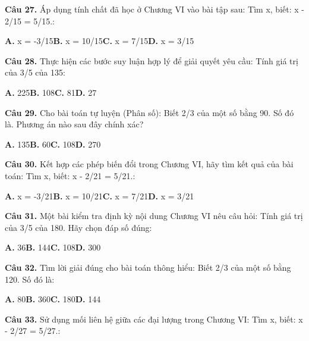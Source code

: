 \documentclass[11pt,a4paper]{article}
\begin{document}
\textbf{\color{primary} Câu 27.} Áp dụng tính chất đã học ở Chương VI vào bài tập sau: Tìm x, biết: x - 2/15 = 5/15.:\par
\hspace*{1.5em}\textbf{A.} x = -3/15\quad\quad \textbf{B.} x = 10/15\quad\quad \textbf{C.} x = 7/15\quad\quad \textbf{D.} x = 3/15\par\vspace{2pt}
\textbf{\color{primary} Câu 28.} Thực hiện các bước suy luận hợp lý để giải quyết yêu cầu: Tính giá trị của 3/5 của 135:\par
\hspace*{1.5em}\textbf{A.} 225\quad\quad \textbf{B.} 108\quad\quad \textbf{C.} 81\quad\quad \textbf{D.} 27\par\vspace{2pt}
\textbf{\color{primary} Câu 29.} Cho bài toán tự luyện (Phân số): Biết 2/3 của một số bằng 90. Số đó là. Phương án nào sau đây chính xác?\par
\hspace*{1.5em}\textbf{A.} 135\quad\quad \textbf{B.} 60\quad\quad \textbf{C.} 108\quad\quad \textbf{D.} 270\par\vspace{2pt}
\textbf{\color{primary} Câu 30.} Kết hợp các phép biến đổi trong Chương VI, hãy tìm kết quả của bài toán: Tìm x, biết: x - 2/21 = 5/21.:\par
\hspace*{1.5em}\textbf{A.} x = -3/21\quad\quad \textbf{B.} x = 10/21\quad\quad \textbf{C.} x = 7/21\quad\quad \textbf{D.} x = 3/21\par\vspace{2pt}
\textbf{\color{primary} Câu 31.} Một bài kiểm tra định kỳ nội dung Chương VI nêu câu hỏi: Tính giá trị của 3/5 của 180. Hãy chọn đáp số đúng:\par
\hspace*{1.5em}\textbf{A.} 36\quad\quad \textbf{B.} 144\quad\quad \textbf{C.} 108\quad\quad \textbf{D.} 300\par\vspace{2pt}
\textbf{\color{primary} Câu 32.} Tìm lời giải đúng cho bài toán thông hiểu: Biết 2/3 của một số bằng 120. Số đó là:\par
\hspace*{1.5em}\textbf{A.} 80\quad\quad \textbf{B.} 360\quad\quad \textbf{C.} 180\quad\quad \textbf{D.} 144\par\vspace{2pt}
\textbf{\color{primary} Câu 33.} Sử dụng mối liên hệ giữa các đại lượng trong Chương VI: Tìm x, biết: x - 2/27 = 5/27.:\par
\end{document}
